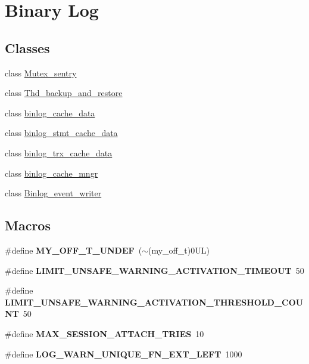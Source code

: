 \hypertarget{group__Binary__Log}{}\section{Binary Log}
\label{group__Binary__Log}
\subsection*{Classes}
\begin{DoxyCompactItemize}
\item 
class \mbox{\hyperlink{classMutex__sentry}{Mutex\+\_\+sentry}}
\item 
class \mbox{\hyperlink{classThd__backup__and__restore}{Thd\+\_\+backup\+\_\+and\+\_\+restore}}
\item 
class \mbox{\hyperlink{classbinlog__cache__data}{binlog\+\_\+cache\+\_\+data}}
\item 
class \mbox{\hyperlink{classbinlog__stmt__cache__data}{binlog\+\_\+stmt\+\_\+cache\+\_\+data}}
\item 
class \mbox{\hyperlink{classbinlog__trx__cache__data}{binlog\+\_\+trx\+\_\+cache\+\_\+data}}
\item 
class \mbox{\hyperlink{classbinlog__cache__mngr}{binlog\+\_\+cache\+\_\+mngr}}
\item 
class \mbox{\hyperlink{classBinlog__event__writer}{Binlog\+\_\+event\+\_\+writer}}
\end{DoxyCompactItemize}
\subsection*{Macros}
\begin{DoxyCompactItemize}
\item 
\mbox{\label{group__Binary__Log_ga5aab2d267393c9edd4b54a7c51f214b5}} 
\#define {\bfseries M\+Y\+\_\+\+O\+F\+F\+\_\+\+T\+\_\+\+U\+N\+D\+EF}~($\sim$(my\+\_\+off\+\_\+t)0\+U\+L)
\item 
\mbox{\label{group__Binary__Log_gac8c072f1c240a3925f70fe927aa4b303}} 
\#define {\bfseries L\+I\+M\+I\+T\+\_\+\+U\+N\+S\+A\+F\+E\+\_\+\+W\+A\+R\+N\+I\+N\+G\+\_\+\+A\+C\+T\+I\+V\+A\+T\+I\+O\+N\+\_\+\+T\+I\+M\+E\+O\+UT}~50
\item 
\mbox{\label{group__Binary__Log_ga5eb15a4577c16ac29e9e49bbb91be40a}} 
\#define {\bfseries L\+I\+M\+I\+T\+\_\+\+U\+N\+S\+A\+F\+E\+\_\+\+W\+A\+R\+N\+I\+N\+G\+\_\+\+A\+C\+T\+I\+V\+A\+T\+I\+O\+N\+\_\+\+T\+H\+R\+E\+S\+H\+O\+L\+D\+\_\+\+C\+O\+U\+NT}~50
\item 
\mbox{\label{group__Binary__Log_ga731816acd3e6040814a1383f6eb2fbe9}} 
\#define {\bfseries M\+A\+X\+\_\+\+S\+E\+S\+S\+I\+O\+N\+\_\+\+A\+T\+T\+A\+C\+H\+\_\+\+T\+R\+I\+ES}~10
\item 
\mbox{\label{group__Binary__Log_ga1a60f647184471fabea338e908978317}} 
\#define {\bfseries L\+O\+G\+\_\+\+W\+A\+R\+N\+\_\+\+U\+N\+I\+Q\+U\+E\+\_\+\+F\+N\+\_\+\+E\+X\+T\+\_\+\+L\+E\+FT}~1000
\end{DoxyCompactItemize}
